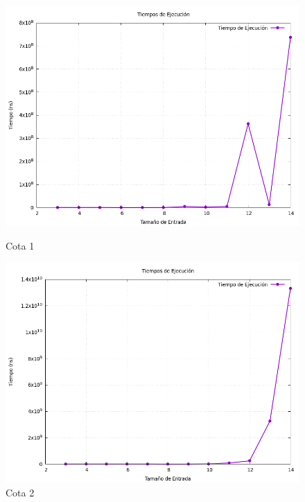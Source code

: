 \documentclass[11pt,openany]{book}
\begin{document}
\begin{figure}[H]
      \centering
      \begin{minipage}{.48\textwidth}
            \centering
            \includegraphics[width=1\linewidth]{assets/Img/Cota_1_BB/grafico_tiempos.png}
            \caption{Cota 1}
            \label{fig:Cota 1}
      \end{minipage}%
      \begin{minipage}{.48\textwidth}
            \centering
            \includegraphics[width=1\linewidth]{assets/Img/Cota_2_BB/grafico_tiempos.png}
            \caption{Cota 2}
            \label{fig:Cota 2}
      \end{minipage}
\end{figure}
\newpage
\end{document}
